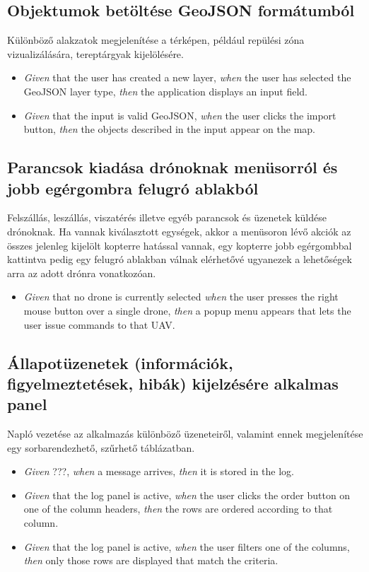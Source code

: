\subsection{Objektumok betöltése GeoJSON formátumból}

Különböző alakzatok megjelenítése a térképen, például repülési zóna vizualizálására, tereptárgyak kijelölésére.

\begin {itemize}
  \item \textit{Given} that the user has created a new layer, \textit{when} the user has selected the GeoJSON layer type, \textit{then} the application displays an input field.
  \item \textit{Given} that the input is valid GeoJSON, \textit{when} the user clicks the import button, \textit{then} the objects described in the input appear on the map.
\end {itemize}


\subsection{Parancsok kiadása drónoknak menüsorról és jobb egérgombra felugró ablakból}

Felszállás, leszállás, viszatérés illetve egyéb parancsok és üzenetek küldése drónoknak. Ha vannak kiválasztott egységek, akkor a menüsoron lévő akciók az összes jelenleg kijelölt kopterre hatással vannak, egy kopterre jobb egérgombbal kattintva pedig egy felugró ablakban válnak elérhetővé ugyanezek a lehetőségek arra az adott drónra vonatkozóan.

\begin {itemize}
  \item \textit{Given} that no drone is currently selected \textit{when} the user presses the right mouse button over a single drone, \textit{then} a popup menu appears that lets the user issue commands to that UAV.
\end {itemize}


\subsection{Állapotüzenetek (információk, figyelmeztetések, hibák) kijelzésére alkalmas panel}

Napló vezetése az alkalmazás különböző üzeneteiről, valamint ennek megjelenítése egy sorbarendezhető, szűrhető táblázatban.

\begin {itemize}
  \item \textit{Given} ???, \textit{when} a message arrives, \textit{then} it is stored in the log.
  \item \textit{Given} that the log panel is active, \textit{when} the user clicks the order button on one of the column headers, \textit{then} the rows are ordered according to that column.
  \item \textit{Given} that the log panel is active, \textit{when} the user filters one of the columns, \textit{then} only those rows are displayed that match the criteria.
\end {itemize}


